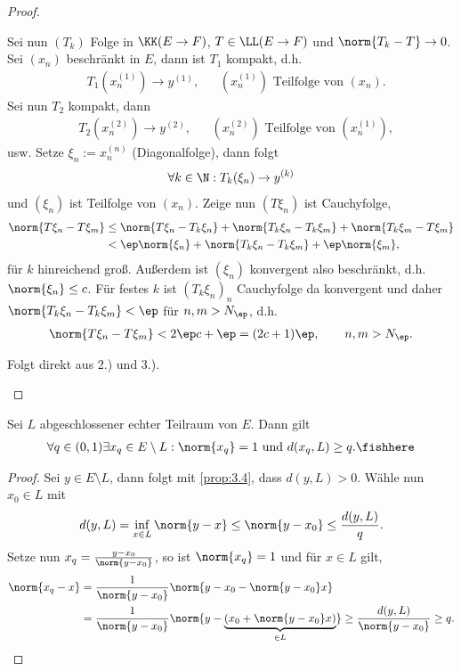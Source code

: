 \begin{proof}
\begin{propenum}
Sei nun $(T_k)$ Folge in $\KK(E\to F)$, $T\in\LL(E\to F)$ und $\norm{T_k-T}\to
0$. Sei $(x_n)$ beschränkt in $E$, dann ist $T_1$ kompakt, d.h.
\begin{align*}
&T_1(x_n^{(1)})\to y^{(1)}, && (x_n^{(1)}) \text{ Teilfolge von } (x_n).
\end{align*}
Sei nun $T_2$ kompakt, dann
\begin{align*}
&T_2(x_n^{(2)})\to y^{(2)}, && (x_n^{(2)}) \text{ Teilfolge von } (x_n^{(1)}),
\end{align*}
usw. Setze $\xi_n := x_n^{(n)}$ (Diagonalfolge), dann folgt
\begin{align*}
\forall k\in\N : T_k(\xi_n)\to y^{(k)}
\end{align*}
und $(\xi_n)$ ist Teilfolge von $(x_n)$. Zeige nun $(T\xi_n)$ ist Cauchyfolge,
\begin{align*}
\norm{T\xi_n-T\xi_m} &\le \norm{T\xi_n-T_k \xi_n}
+ \norm{T_k\xi_n-T_k\xi_m} + \norm{T_k\xi_m-T\xi_m}\\
&< \ep\norm{\xi_n} +\norm{T_k\xi_n-T_k\xi_m} + \ep \norm{\xi_m},
\end{align*}
für $k$ hinreichend groß. Außerdem ist $(\xi_n)$ konvergent also beschränkt,
d.h. $\norm{\xi_n}\le c$. Für festes $k$ ist $(T_k\xi_n)_n$ Cauchyfolge da
konvergent und daher $\norm{T_k\xi_n-T_k\xi_m}<\ep$ für $n,m>N_\ep$, d.h.
\begin{align*}
\norm{T\xi_n-T\xi_m}  < 2\ep c + \ep = (2c+1)\ep,\qquad n,m> N_\ep.
\end{align*}
\item Folgt direkt aus 2.) und 3.).\qedhere
\end{propenum}
\end{proof}

\begin{lem}
\label{prop:6.9}
Sei $L$ abgeschlossener echter Teilraum von $E$. Dann gilt
\begin{align*}
\forall q \in (0,1) \exists x_q\in E\setminus L : \norm{x_q} = 1 \text{ und }
d(x_q,L)\ge q.\fishhere
\end{align*} 
\end{lem}
\begin{proof}
Sei $y\in E\setminus L$, dann folgt mit \ref{prop:3.4}, dass $d(y,L)>0$. Wähle
nun $x_0\in L$ mit
\begin{align*}
d(y,L) = \inf_{x\in L} \norm{y-x} \le \norm{y-x_0} \le \frac{d(y,L)}{q}.
\end{align*}
Setze nun $x_q = \frac{y-x_0}{\norm{y-x_0}}$, so ist $\norm{x_q}=1$ und für
$x\in L$ gilt,
\begin{align*}
\norm{x_q-x} &= \frac{1}{\norm{y-x_0}}\norm{y-x_0-\norm{y-x_0}x}
\\ &= \frac{1}{\norm{y-x_0}}\norm{y-\underbrace{(x_0+\norm{y-x_0}x)}_{\in L}}
\ge \frac{d(y,L)}{\norm{y-x_0}} \ge q.\qedhere
\end{align*}
\end{proof}

